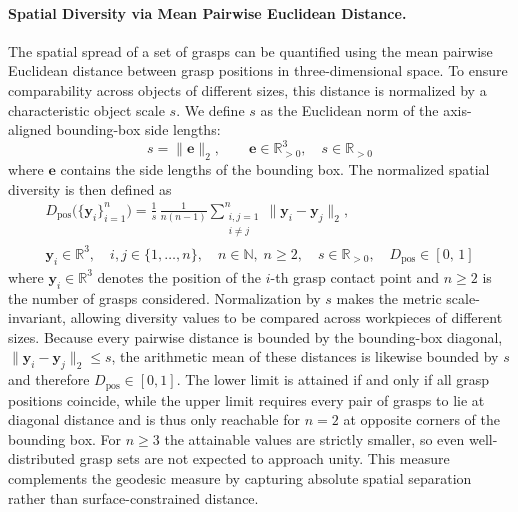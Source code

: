 \paragraph{Spatial Diversity via Mean Pairwise Euclidean Distance.}
The spatial spread of a set of grasps can be quantified using the mean pairwise Euclidean distance between grasp positions in three-dimensional space.
To ensure comparability across objects of different sizes, this distance is normalized by a characteristic object scale \(s\). We define \(s\) as the
Euclidean norm of the axis-aligned bounding-box side lengths:
%
\begin{equation}
    s = \lVert \mathbf{e} \rVert_2,
    \qquad
    \mathbf{e} \in \mathbb{R}^{3}_{>0},\quad
    s \in \mathbb{R}_{>0}
\end{equation}
%
where \(\mathbf{e}\) contains the side lengths of the bounding box. The normalized spatial diversity is then defined as
%
\begin{equation}
    \begin{gathered}
        D_{\mathrm{pos}}\bigl(\{\mathbf{y}_i\}_{i=1}^{n}\bigr)
        =
        \frac{1}{s}\,
        \frac{1}{n(n-1)}
        \sum_{\substack{i,j=1 \\ i \neq j}}^{n}
        \lVert \mathbf{y}_i - \mathbf{y}_j \rVert_2, \\[4pt]
        \mathbf{y}_i \in \mathbb{R}^{3},\quad
        i,j \in \{1,\ldots,n\},\quad
        n \in \mathbb{N},\; n \geq 2,\quad
        s \in \mathbb{R}_{>0},\quad
        D_{\mathrm{pos}} \in [0,\,1]
    \end{gathered}
\end{equation}
%
where $\mathbf{y}_i \in \mathbb{R}^3$ denotes the position of the $i$-th grasp contact point and $n \geq 2$ is the number of grasps considered.
Normalization by $s$ makes the metric scale-invariant, allowing diversity values to be compared across workpieces of different sizes. Because every
pairwise distance is bounded by the bounding-box diagonal, $\lVert \mathbf{y}_i - \mathbf{y}_j \rVert_2 \leq s$, the arithmetic mean of these
distances is likewise bounded by $s$ and therefore $D_{\mathrm{pos}} \in [0, 1]$. The lower limit is attained if and only if all grasp positions
coincide, while the upper limit requires every pair of grasps to lie at diagonal distance and is thus only reachable for $n = 2$ at opposite corners
of the bounding box. For $n \geq 3$ the attainable values are strictly smaller, so even well-distributed grasp sets are not expected to approach
unity. This measure complements the geodesic measure by capturing absolute spatial separation rather than surface-constrained distance.

